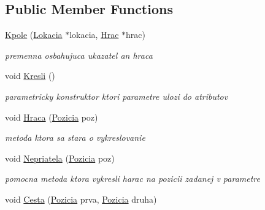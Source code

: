 \subsection*{Public Member Functions}
\begin{DoxyCompactItemize}
\item 
\hypertarget{class_kpole_a63d5f5dc29507cbe8ce0a199ff4f5e8f}{\hyperlink{class_kpole_a63d5f5dc29507cbe8ce0a199ff4f5e8f}{Kpole} (\hyperlink{class_lokacia}{Lokacia} $\ast$lokacia, \hyperlink{class_hrac}{Hrac} $\ast$hrac)}\label{class_kpole_a63d5f5dc29507cbe8ce0a199ff4f5e8f}

\begin{DoxyCompactList}\small\item\em premenna osbahujuca ukazatel an hraca \end{DoxyCompactList}\item 
\hypertarget{class_kpole_a8cc0da29e42f4f637f9be412e58f3f7f}{void \hyperlink{class_kpole_a8cc0da29e42f4f637f9be412e58f3f7f}{Kresli} ()}\label{class_kpole_a8cc0da29e42f4f637f9be412e58f3f7f}

\begin{DoxyCompactList}\small\item\em parametricky konstruktor ktori parametre ulozi do atributov \end{DoxyCompactList}\item 
\hypertarget{class_kpole_a5656de037f98ce24e0d1b2e48255a996}{void \hyperlink{class_kpole_a5656de037f98ce24e0d1b2e48255a996}{Hraca} (\hyperlink{struct_pozicia}{Pozicia} poz)}\label{class_kpole_a5656de037f98ce24e0d1b2e48255a996}

\begin{DoxyCompactList}\small\item\em metoda ktora sa stara o vykreslovanie \end{DoxyCompactList}\item 
\hypertarget{class_kpole_a3b00d8874bed3d779bb07a42a0c26a79}{void \hyperlink{class_kpole_a3b00d8874bed3d779bb07a42a0c26a79}{Nepriatela} (\hyperlink{struct_pozicia}{Pozicia} poz)}\label{class_kpole_a3b00d8874bed3d779bb07a42a0c26a79}

\begin{DoxyCompactList}\small\item\em pomocna metoda ktora vykresli harac na pozicii zadanej v parametre \end{DoxyCompactList}\item 
\hypertarget{class_kpole_a412c877b0caf432f0e9b4a53b3b9e5e7}{void \hyperlink{class_kpole_a412c877b0caf432f0e9b4a53b3b9e5e7}{Cesta} (\hyperlink{struct_pozicia}{Pozicia} prva, \hyperlink{struct_pozicia}{Pozicia} druha)}\label{class_kpole_a412c877b0caf432f0e9b4a53b3b9e5e7}


\end{DoxyCompactItemize}
